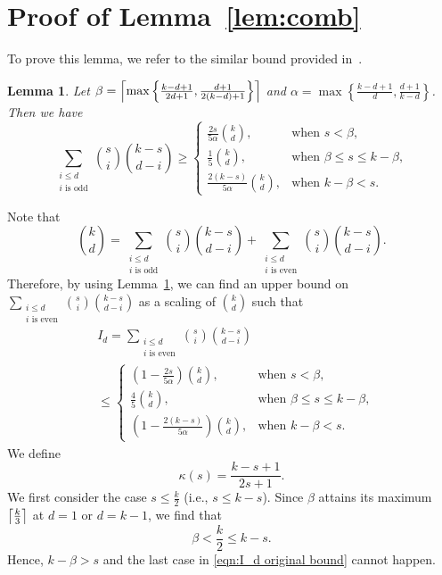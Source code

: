 \documentclass[11pt,onecolumn]{IEEEtran}
\newtheorem{lem}{Lemma}
\newcommand{\beq}{\begin{equation}}
\newcommand{\eeq}{\end{equation}}
\DeclarePairedDelimiter\ceil{\lceil}{\rceil}
\begin{document}
\section{Proof of Lemma~\ref{lem:comb}}\label{app:lem:comb}
To prove this lemma, we refer to the similar bound provided in~\cite{ahn2016community}.
\begin{lem}\label{lem:ahn}
{\it
Let $\beta=\ceil*{\max\left\{\frac{k-d+1}{2d+1},\frac{d+1}{2(k-d)+1}\right\}}$ and $\alpha=\max\left\{\frac{k-d+1}{d},\frac{d+1}{k-d}\right\}$. Then we have
\beq
\sum_{\substack{i\leq d\\ i \text{ is odd}}}{s\choose i}{k-s\choose d-i}\geq 
\begin{cases}
\frac{2s}{5\alpha}{k\choose d},& \text{when } s<\beta,\\
\frac{1}{5}{k\choose d}, & \text{when } \beta\leq s\leq k-\beta,\\
\frac{2(k-s)}{5\alpha}{k\choose d}, &\text{when }k-\beta<s.
\end{cases}
\eeq
}
\end{lem}


Note that
\beq
{k\choose d}=\sum_{\substack{i\leq d\\ i \text{ is odd}}}{s\choose i}{k-s\choose d-i}+\sum_{\substack{i\leq d\\ i \text{ is even}}}{s\choose i}{k-s\choose d-i}.
\eeq
Therefore, by using Lemma~\ref{lem:ahn}, we can find an upper bound on $\sum_{\substack{i\leq d\\ i \text{ is even}}}{s\choose i}{k-s\choose d-i}$ as a scaling of ${k \choose d}$ such that
 \beq
 \begin{aligned}
&I_d=\sum_{\substack{i\leq d\\ i \text{ is even}}}{s\choose i}{k-s\choose d-i}\\
&\leq
 \begin{cases} \label{eqn:I_d original bound}
\left(1- \frac{2s}{5\alpha}\right){k\choose d},& \text{when } s<\beta,\\
\frac{4}{5}{k\choose d}, & \text{when } \beta\leq s\leq k-\beta,\\
\left(1-\frac{2(k-s)}{5\alpha}\right){k\choose d}, &\text{when }k-\beta<s.
 \end{cases}
 \end{aligned}
 \eeq
We define
\beq
\kappa(s) = \frac{k-s+1}{2s+1}.
\eeq
We first consider the case $s \leq \frac{k}{2}$ (i.e., $s \leq k-s$). Since $\beta$ attains its maximum $\ceil*{\frac{k}{3}}$ at $d=1$ or $d=k-1$, we find that
$$
\beta < \frac{k}{2} \leq k-s.
$$
Hence, $k-\beta > s$ and the last case in \eqref{eqn:I_d original bound} cannot happen.
\end{document}

